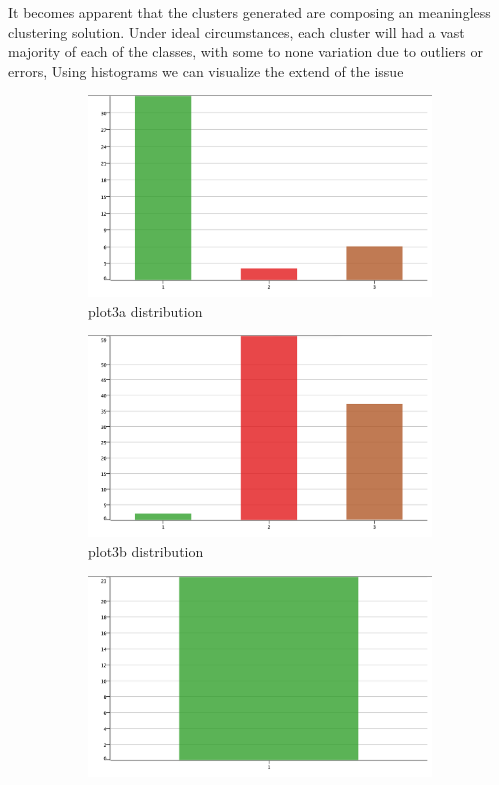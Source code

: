 \documentclass[11pt]{article}
\begin{document}
		 	\fi
			It becomes apparent that the clusters generated are composing an meaningless clustering solution. Under ideal circumstances, each cluster will had a vast majority of each of the classes, with some to none variation due to outliers or errors, Using histograms we can visualize the extend of the issue 
			\iftrue
			\begin{figure}[H]
				\centering
				\begin{subfigure}{0.4\textwidth}
			 		\includegraphics[width=\textwidth]{res/t1/t14/t14-plota-dist}
					\caption{plot3a distribution}
					\label{fig:first}
				\end{subfigure}
				\hfill
				\begin{subfigure}{0.4\textwidth}
			 		\includegraphics[width=\textwidth]{res/t1/t14/t14-plotb-dist}
					\caption{plot3b distribution}
					\label{fig:second}
				\end{subfigure}
				\hfill
				\begin{subfigure}{0.4\textwidth}
			 		\includegraphics[width=\textwidth]{res/t1/t14/t14-plotc-dist}

\end{subfigure}
\end{figure}
\end{document}

